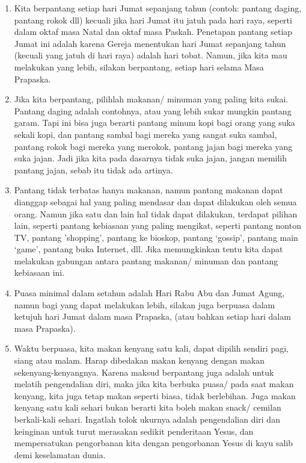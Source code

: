 \small
\begin{enumerate}
\item Kita berpantang setiap hari Jumat sepanjang tahun (contoh: pantang daging, pantang rokok dll) kecuali jika hari Jumat itu jatuh pada hari raya, seperti dalam oktaf masa Natal dan oktaf masa Paskah. Penetapan pantang setiap Jumat ini adalah karena Gereja menentukan hari Jumat sepanjang tahun (kecuali yang jatuh di hari raya) adalah hari tobat. Namun, jika kita mau melakukan yang lebih, silakan berpantang, setiap hari selama Masa Prapaska.

\item Jika kita berpantang, pilihlah makanan/ minuman yang paling kita sukai. Pantang daging adalah contohnya, atau yang lebih sukar mungkin pantang garam. Tapi ini bisa juga berarti pantang minum kopi bagi orang yang suka sekali kopi, dan pantang sambal bagi mereka yang sangat suka sambal, pantang rokok bagi mereka yang merokok, pantang jajan bagi mereka yang suka jajan. Jadi jika kita pada dasarnya tidak suka jajan, jangan memilih pantang jajan, sebab itu tidak ada artinya.

\item Pantang tidak terbatas hanya makanan, namun pantang makanan dapat dianggap sebagai hal yang paling mendasar dan dapat dilakukan oleh semua orang. Namun jika satu dan lain hal tidak dapat dilakukan, terdapat pilihan lain, seperti pantang kebiasaan yang paling mengikat, seperti pantang nonton TV, pantang 'shopping', pantang ke bioskop, pantang `gossip', pantang main `game', pantang buka Internet, dll. Jika memungkinkan tentu kita dapat melakukan gabungan antara pantang makanan/ minuman dan pantang kebiasaan ini.

\item Puasa minimal dalam setahun adalah Hari Rabu Abu dan Jumat Agung, namun bagi yang dapat melakukan lebih, silakan juga berpuasa dalam ketujuh hari Jumat dalam masa Prapaska, (atau bahkan setiap hari dalam masa Prapaska).

\item Waktu berpuasa, kita makan kenyang satu kali, dapat dipilih sendiri pagi, siang atau malam. Harap dibedakan makan kenyang dengan makan sekenyang-kenyangnya. Karena maksud berpantang juga adalah untuk melatih pengendalian diri, maka jika kita berbuka puasa/ pada saat makan kenyang, kita juga tetap makan seperti biasa, tidak berlebihan. Juga makan kenyang satu kali sehari bukan berarti kita boleh makan snack/ cemilan berkali-kali sehari. Ingatlah tolok ukurnya adalah pengendalian diri dan keinginan untuk turut merasakan sedikit penderitaan Yesus, dan mempersatukan pengorbanan kita dengan pengorbanan Yesus di kayu salib demi keselamatan dunia.


\end{enumerate}
